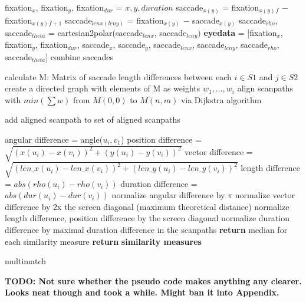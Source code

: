 \documentclass[a4paper, 12pt]{scrreprt}
\begin{document}
{\begin{algorithm}[H]
	\begin{small}
	
	{ 
		{
			fixation$_x$, fixation$_y$, fixation$_{dur}$ = $x, y, duration$ \;
			saccade$_{x(y)}$ = fixation$_{x(y)}$$_{f}$ $-$ fixation$_{x(y)}$$_{f+1}$ \;
			saccade$_{lenx(leny)}$ = fixation$_{x(y)}$ $-$ saccade$_{x(y)}$\;
			saccade$_{rho}$, saccade$_{theta}$ = cartesian2polar(saccade$_{lenx}$, saccade$_{leny})$ \;
			\textbf{eyedata} = [fixation$_x$, fixation$_y$, fixation$_{dur}$, saccade$_x$, saccade$_y$, \newline saccade$_{lenx}$, saccade$_{leny}$, saccade$_{rho}$, saccade$_{theta}$]
		}
		{
			{
			{combine saccades}
			}
		}
	}
		{
			calculate M: Matrix of saccade length differences between each $i \in S1$ and  $j \in S2$\;
			create a directed graph with elements of M as weights $w_1, \ldots, w_i$\;
			align scanpaths with $min(\sum w)$ from $M(0,0)$ to $M(n,m)$ via Dijkstra algorithm\;
		
		add aligned scanpath to set of aligned scanpaths \;

		{
			angular difference = angle($u_i, v_1$)\;
			position difference = $\sqrt{(x(u_i) - x(v_i))^2 + (y(u_i) - y(v_i))^2}$ \;
			vector difference = $\sqrt{(len\_x(u_i) - len\_x(v_i))^2 + (len\_y(u_i) - len\_y(v_i))^2}$\;
			length difference = $abs(rho(u_i) - rho(v_i))$\;
			duration difference = $abs(dur(u_i)-dur(v_i))$ \;
		}
		normalize angular difference by $\pi$\;
		normalize vector difference by 2x the screen diagonal (maximum theoretical distance)\;
		normalize length difference, position difference by the screen diagonal\;
		normalize duration difference by maximal duration difference in the scanpaths\;
		\textbf{return} median for each similarity measure
	\textbf{return} \textbf{similarity measures}
}
	\caption{multimatch}
	\label{algo:multimatch}
\end{small}
\end{algorithm}
\textbf{TODO: Not sure whether the pseudo code makes anything any clearer. Looks neat though and took a while. Might ban it into Appendix.}

}
\end{document}
